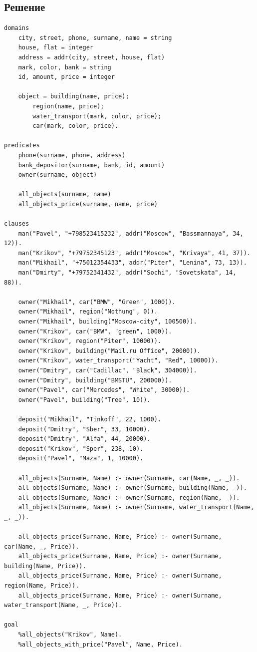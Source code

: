 \documentclass[12pt]{report}
\begin{document}
\subsection*{Решение}
\begin{lstlisting}
domains
	city, street, phone, surname, name = string
	house, flat = integer
	address = addr(city, street, house, flat)
	mark, color, bank = string
	id, amount, price = integer

	object = building(name, price);
		region(name, price);
		water_transport(mark, color, price);
		car(mark, color, price).

predicates
	phone(surname, phone, address)
	bank_depositor(surname, bank, id, amount)
	owner(surname, object)

	all_objects(surname, name)
	all_objects_price(surname, name, price)

clauses
	man("Pavel", "+798523415232", addr("Moscow", "Bassmannaya", 34, 12)).
	man("Krikov", "+79752345123", addr("Moscow", "Krivaya", 41, 37)).
	man("Mikhail", "+75012354433", addr("Piter", "Lenina", 73, 13)).
	man("Dmirty", "+79752341432", addr("Sochi", "Sovetskata", 14, 88)).

	owner("Mikhail", car("BMW", "Green", 1000)).
	owner("Mikhail", region("Nothung", 0)).
	owner("Mikhail", building("Moscow-city", 100500)).
	owner("Krikov", car("BMW", "green", 1000)).
	owner("Krikov", region("Piter", 10000)).
	owner("Krikov", building("Mail.ru Office", 20000)).
	owner("Krikov", water_transport("Yacht", "Red", 10000)).
	owner("Dmitry", car("Cadillac", "Black", 304000)).
	owner("Dmitry", building("BMSTU", 200000)).
	owner("Pavel", car("Mercedes", "White", 30000)).
	owner("Pavel", building("Tree", 10)).
	
	deposit("Mikhail", "Tinkoff", 22, 1000).
	deposit("Dmitry", "Sber", 33, 10000).
	deposit("Dmitry", "Alfa", 44, 20000).
	deposit("Krikov", "Sper", 238, 10).
	deposit("Pavel", "Maza", 1, 10000).
	
	all_objects(Surname, Name) :- owner(Surname, car(Name, _, _)).
	all_objects(Surname, Name) :- owner(Surname, building(Name, _)).
	all_objects(Surname, Name) :- owner(Surname, region(Name, _)).
	all_objects(Surname, Name) :- owner(Surname, water_transport(Name, _, _)).
	
	all_objects_price(Surname, Name, Price) :- owner(Surname, car(Name, _, Price)).
	all_objects_price(Surname, Name, Price) :- owner(Surname, building(Name, Price)).
	all_objects_price(Surname, Name, Price) :- owner(Surname, region(Name, Price)).
	all_objects_price(Surname, Name, Price) :- owner(Surname, water_transport(Name, _, Price)).

goal
	%all_objects("Krikov", Name).
	%all_objects_with_price("Pavel", Name, Price).

\end{lstlisting}
\end{document}
